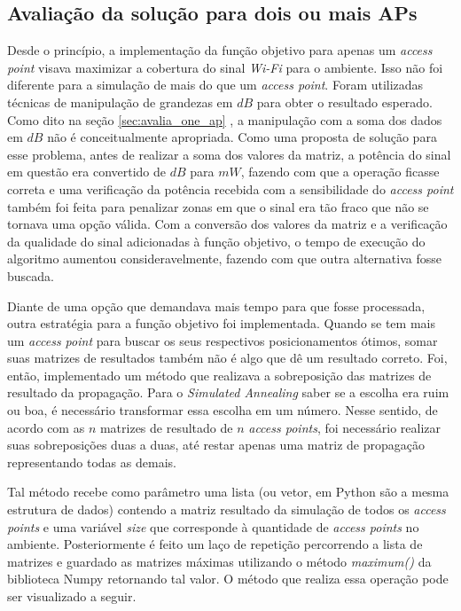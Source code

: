 \documentclass[
	12pt,				%
	twoside,			%
	a4paper,			%
	english,			%
	french,				%
	spanish,			%
	brazil				%
	]{abntex2}
\begin{document}
\subsection{Avaliação da solução para dois ou mais
APs}\label{sec:avalia_dois_ou_mais}

Desde o princípio, a implementação da função objetivo para apenas um
\emph{access point} visava maximizar a cobertura do sinal \emph{Wi-Fi}
para o ambiente. Isso não foi diferente para a simulação de mais do que
um \emph{access point}. Foram utilizadas técnicas de manipulação de
grandezas em \(dB\) para obter o resultado esperado. Como dito na seção
\ref{sec:avalia_one_ap} , a manipulação com a soma dos dados em \(dB\)
não é conceitualmente apropriada. Como uma proposta de solução para esse
problema, antes de realizar a soma dos valores da matriz, a potência do
sinal em questão era convertido de \(dB\) para \(mW\), fazendo com que a
operação ficasse correta e uma verificação da potência recebida com a
sensibilidade do \emph{access point} também foi feita para penalizar
zonas em que o sinal era tão fraco que não se tornava uma opção válida.
Com a conversão dos valores da matriz e a verificação da qualidade do
sinal adicionadas à função objetivo, o tempo de execução do algoritmo
aumentou consideravelmente, fazendo com que outra alternativa fosse
buscada.

Diante de uma opção que demandava mais tempo para que fosse processada,
outra estratégia para a função objetivo foi implementada. Quando se tem
mais um \emph{access point} para buscar os seus respectivos
posicionamentos ótimos, somar suas matrizes de resultados também não é
algo que dê um resultado correto. Foi, então, implementado um método que
realizava a sobreposição das matrizes de resultado da propagação. Para o
\emph{Simulated Annealing} saber se a escolha era ruim ou boa, é
necessário transformar essa escolha em um número. Nesse sentido, de
acordo com as \(n\) matrizes de resultado de \(\textit{n}\) \emph{access
points}, foi necessário realizar suas sobreposições duas a duas, até
restar apenas uma matriz de propagação representando todas as demais.

Tal método recebe como parâmetro uma lista (ou vetor, em Python são a
mesma estrutura de dados) contendo a matriz resultado da simulação de
todos os \emph{access points} e uma variável \emph{size} que corresponde
à quantidade de \emph{access points} no ambiente. Posteriormente é feito
um laço de repetição percorrendo a lista de matrizes e guardado as
matrizes máximas utilizando o método \emph{maximum()} da biblioteca
Numpy retornando tal valor. O método que realiza essa operação pode ser
visualizado a seguir.
\end{document}
